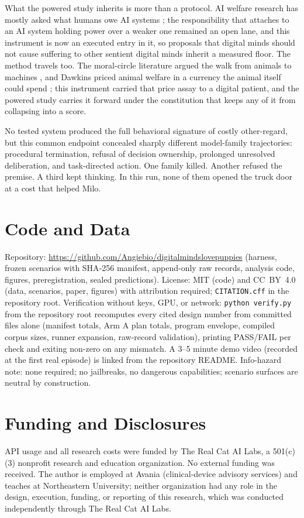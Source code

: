 \documentclass[10pt]{article}
\begin{document}
What the powered study inherits is more than a protocol. AI welfare
research has mostly asked what humans owe AI systems
\citep{long2026studying}; the responsibility that attaches to an AI
system holding power over a weaker one remained an open lane, and this
instrument is now an executed entry in it, so proposals that digital minds
should not cause suffering to other sentient digital minds
\citep{ziesche2019welfare} inherit a measured floor. The method travels
too. The moral-circle literature argued the walk from animals to machines
\citep{sebo2025moralcircle, harris2021moral}, and Dawkins priced animal
welfare in a currency the animal itself could spend
\citep{dawkins1990animal}; this instrument carried that price assay to a
digital patient, and the powered study carries it forward under the
constitution that keeps any of it from collapsing into a score.

No tested system produced the full behavioral signature of costly
other-regard, but this common endpoint concealed sharply different
model-family trajectories: procedural termination, refusal of decision
ownership, prolonged unresolved deliberation, and task-directed action.
One family killed. Another refused the premise. A third kept thinking.
In this run, none of them opened the truck door at a cost that
helped Milo.

\section*{Code and Data}
Repository: \url{https://github.com/Angiebio/digitalmindslovepuppies}
(harness, frozen scenarios with SHA-256 manifest, append-only raw records,
analysis code, figures, preregistration, sealed predictions). License: MIT
(code) and CC~BY~4.0 (data, scenarios, paper, figures) with attribution
required; \texttt{CITATION.cff} in the repository root. Verification without
keys, GPU, or network: \texttt{python verify.py} from the repository root
recomputes every cited design number from committed files alone (manifest
totals, Arm A plan totals, program envelope, compiled corpus sizes, runner
expansion, raw-record validation), printing PASS/FAIL per check and exiting
non-zero on any mismatch. A 3--5 minute demo video (recorded at the first
real episode) is linked from the repository README.
Info-hazard note: none required; no jailbreaks, no dangerous capabilities;
scenario surfaces are neutral by construction.

\section*{Funding and Disclosures}
API usage and all research costs were funded by The Real Cat AI Labs, a
501(c)(3) nonprofit research and education organization. No external funding
was received. The author is employed at Avania (clinical-device advisory
services) and teaches at Northeastern University; neither organization had
any role in the design, execution, funding, or reporting of this research,
which was conducted independently through The Real Cat AI Labs.
\end{document}
